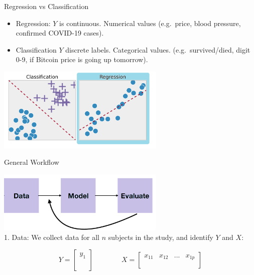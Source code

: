 \documentclass[
  ignorenonframetext,
]{beamer}
\providecommand{\tightlist}{%
  \setlength{\itemsep}{0pt}\setlength{\parskip}{0pt}}
\begin{document}
\begin{frame}{Regression vs Classification}
\protect\hypertarget{regression-vs-classification}{}
\begin{itemize}
\tightlist
\item
  Regression: \(Y\) is continuous. Numerical values (e.g.~price, blood
  pressure, confirmed COVID-19 cases).
\item
  Classification \(Y\) discrete labels. Categorical values.
  (e.g.~survived/died, digit 0-9, if Bitcoin price is going up
  tomorrow).
\end{itemize}

\centering

\includegraphics[width=0.6\textwidth,height=\textheight]{image2.png}\\
\end{frame}

\begin{frame}{General Workflow}
\protect\hypertarget{general-workflow}{}
\centering

\includegraphics[width=0.6\textwidth,height=\textheight]{image3.png}\\
1. Data: We collect data for all \(n\) subjects in the study, and
identify \(Y\) and \(X\):

\[ Y = \begin{bmatrix}
           y_{1} \\
            \\
                  \\
         \end{bmatrix}  \qquad \qquad  X = \begin{bmatrix}
           x_{11}& x_{12} &...&x_{1p}\\
          &&&\\
           & & &
         \end{bmatrix} \]
\end{frame}
\end{document}
